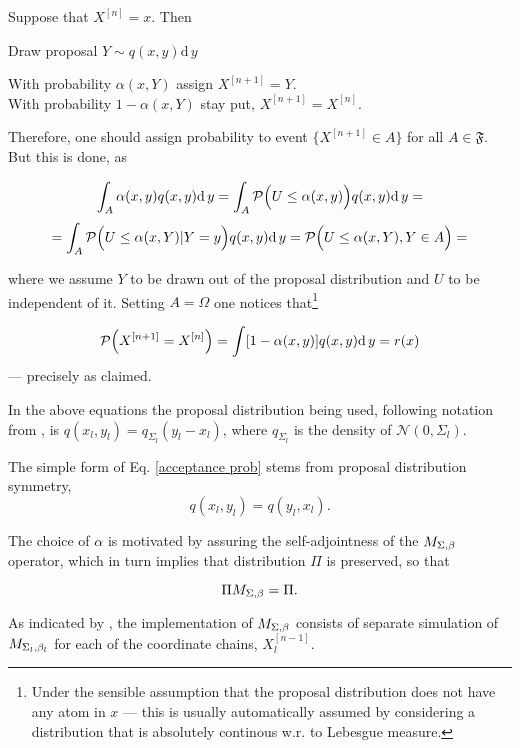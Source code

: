 \documentclass{article}
\begin{document}
\begin{Algo}
	Suppose that $X^{[n]} = x$. Then
	
	\begin{algor}
		\item{ 	Draw proposal $Y \sim q(x,y)\mathrm{d}\,y$ 	}
		\item{ 	With probability $\alpha(x,Y)$ assign $X^{[n+1]} = Y$. \\With probability $1-\alpha(x,Y)$ stay put, $X^{[n+1]} = X^{[n]}$. }
	\end{algor}	
		
\end{Algo}

Therefore, one should assign probability to event $\{ X^{[n+1]} \in A\}$ for all $A \in \mathfrak{F}$. But this is done, as

$$\int_A  \alpha(x,y) q(x,y) \mathrm{d}\,y = \int_A \mathcal{P} \Big( U \leq \alpha(x,y) \Big)q(x,y) \mathrm{d}\,y =$$
$$=\int_A \mathcal{P}\Big( U \leq \alpha(x,Y) | Y=y \Big)q(x,y) \mathrm{d}\,y = \mathcal{P}\Big( U \leq \alpha(x,Y), Y \in A \Big)=$$

where we assume $Y$ to be drawn out of the proposal distribution and $U$ to be independent of it. Setting $A = \Omega$ one notices that\footnote{Under the sensible assumption that the proposal distribution does not have any atom in $x$ --- this is usually automatically assumed by considering a distribution that is absolutely continous w.r. to Lebesgue measure.} 

$$ \mathcal{P}\Big(X^{[n+1]} = X^{[n]}\Big) = \int  [ 1 - \alpha(x,y)] q(x,y) \mathrm{d}\,y = r(x)$$
--- precisely as claimed. 

In the above equations the proposal distribution being used, following notation from \cite{CharlesJ.Geyer}, is $q(x_l,y_l) = q_{\Sigma_l} (y_l - x_l)$, where $q_{\Sigma_l}$ is the density of $\mathcal{N}(0, \Sigma_l)$. 

The simple form of Eq. \ref{acceptance prob} stems from proposal distribution symmetry, $$q(x_l,y_l) = q(y_l,x_l).$$

The choice of $\alpha$ is motivated by assuring the self-adjointness of the $M_{\Sigma,\beta}$ operator, which in turn implies that distribution $\Pi$ is preserved, so that
	
\begin{equation}
	\Pi M_{\Sigma,\beta} = \Pi.		
\end{equation}	

As indicated by \cite{BM2}, the implementation of $M_{\Sigma,\beta}$ consists of separate simulation of $M_{\Sigma_{l},\beta_{l}}$ for each of the coordinate chains,  $X^{[n-1]}_l$.
\end{document}
